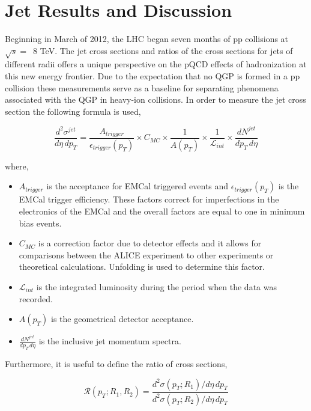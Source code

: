 \chapter{Jet Results and Discussion} \label{ch:analysis}

Beginning in March of 2012, the LHC began seven months of pp collisions at $\sqrt{s} = \,$ 8 TeV.  The jet cross sections and ratios of the cross sections for jets of different radii offers a unique perspective on the pQCD effects of hadronization at this new energy frontier.  Due to the expectation that no QGP is formed in a pp collision these measurements serve as a baseline for separating phenomena associated with the QGP in heavy-ion collisions.  In order to measure the jet cross section the following formula is used,

\begin{equation}
	\frac{d^{2} \sigma^{jet}}{d\eta \, dp_{T}} = \frac{A_{trigger}}{\epsilon_{trigger}(p_{T})} \times C_{MC} \times \frac{1}{A(p_{T}) } \times \frac{1}{\mathscr{L}_{int}} \times \frac{dN^{jet}}{dp_{T} \, d\eta}
\label{eq:xsecdef}
\end{equation}

\noindent
where,

\begin{itemize}
  \item $A_{trigger}$ is the acceptance for EMCal triggered events and $\epsilon_{trigger}(p_{T})$ is the EMCal trigger efficiency.  These factors correct for imperfections in the electronics of the EMCal and the overall factors are equal to one in minimum bias events.
  \item $C_{MC}$ is a correction factor due to detector effects and it allows for comparisons between the ALICE experiment to other experiments or theoretical calculations.  Unfolding is used to determine this factor.
  \item $\mathscr{L}_{int}$ is the integrated luminosity during the period when the data was recorded.
  \item $A(p_{T})$ is the geometrical detector acceptance.
  \item $\frac{dN^{jet}}{dp_{T} \, d\eta}$ is the inclusive jet momentum spectra.
  
\end{itemize}

\noindent
Furthermore, it is useful to define the ratio of cross sections,

\begin{equation}
\mathscr{R}(p_{T};R_{1},R_{2}) = \frac{d^{2}\sigma(p_{T};R_{1})/d\eta \, dp_{T}}{d^{2}\sigma(p_{T};R_{2})/d\eta \, dp_{T}}
\label{eq:xsecratio}
\end{equation}

